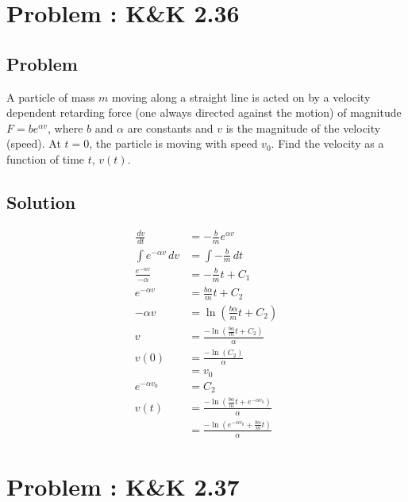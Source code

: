 \documentclass[solutions]{esg8012pset}
\renewcommand{\d}{\,d}
\begin{document}
\section{Problem \thesection: K\&K 2.36}
\subsection{Problem}
  A particle of mass $m$ moving along a straight line is acted on by a velocity dependent retarding force (one always directed against the motion) of magnitude $F = be^{\alpha v}$, where $b$ and $\alpha$ are constants and $v$ is the magnitude of the velocity (speed). At $t = 0$, the particle is moving with speed $v_0$. Find the velocity as a function of time $t$, $v(t)$.
\subsection{Solution}
  \begin{align*}
    \frac{\d v}{\d t} & = -\frac{b}{m}e^{\alpha v} \\
    \int e^{-\alpha v} \d v & = \int -\frac{b}{m}\d t \\
    \frac{e^{-\alpha v}}{-\alpha} & = -\frac{b}{m}t + C_1 \\
    e^{-\alpha v} & = \frac{b\alpha}{m}t + C_2 \\
    -\alpha v & = \ln\left(\frac{b\alpha}{m}t + C_2\right) \\
    v & = \frac{-\ln\left(\frac{b\alpha}{m}t + C_2\right)}{\alpha} \\
    v(0) & = \frac{-\ln\left(C_2\right)}{\alpha} \\
         & = v_0 \\
    e^{-\alpha v_0} & = C_2 \\
    v(t) & = \frac{-\ln\left(\frac{b\alpha}{m}t + e^{-\alpha v_0}\right)}{\alpha} \\
     & = \frac{-\ln\left(e^{-\alpha v_0} + \frac{b\alpha}{m}t\right)}{\alpha}
  \end{align*}
\section{Problem \thesection: K\&K 2.37}
\end{document}
